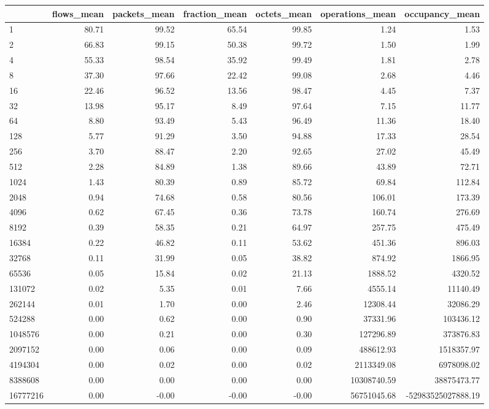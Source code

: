 \begin{tabular}{lrrrrrr}
\toprule
 & flows_mean & packets_mean & fraction_mean & octets_mean & operations_mean & occupancy_mean \\
\midrule
1 & 80.71 & 99.52 & 65.54 & 99.85 & 1.24 & 1.53 \\
2 & 66.83 & 99.15 & 50.38 & 99.72 & 1.50 & 1.99 \\
4 & 55.33 & 98.54 & 35.92 & 99.49 & 1.81 & 2.78 \\
8 & 37.30 & 97.66 & 22.42 & 99.08 & 2.68 & 4.46 \\
16 & 22.46 & 96.52 & 13.56 & 98.47 & 4.45 & 7.37 \\
32 & 13.98 & 95.17 & 8.49 & 97.64 & 7.15 & 11.77 \\
64 & 8.80 & 93.49 & 5.43 & 96.49 & 11.36 & 18.40 \\
128 & 5.77 & 91.29 & 3.50 & 94.88 & 17.33 & 28.54 \\
256 & 3.70 & 88.47 & 2.20 & 92.65 & 27.02 & 45.49 \\
512 & 2.28 & 84.89 & 1.38 & 89.66 & 43.89 & 72.71 \\
1024 & 1.43 & 80.39 & 0.89 & 85.72 & 69.84 & 112.84 \\
2048 & 0.94 & 74.68 & 0.58 & 80.56 & 106.01 & 173.39 \\
4096 & 0.62 & 67.45 & 0.36 & 73.78 & 160.74 & 276.69 \\
8192 & 0.39 & 58.35 & 0.21 & 64.97 & 257.75 & 475.49 \\
16384 & 0.22 & 46.82 & 0.11 & 53.62 & 451.36 & 896.03 \\
32768 & 0.11 & 31.99 & 0.05 & 38.82 & 874.92 & 1866.95 \\
65536 & 0.05 & 15.84 & 0.02 & 21.13 & 1888.52 & 4320.52 \\
131072 & 0.02 & 5.35 & 0.01 & 7.66 & 4555.14 & 11140.49 \\
262144 & 0.01 & 1.70 & 0.00 & 2.46 & 12308.44 & 32086.29 \\
524288 & 0.00 & 0.62 & 0.00 & 0.90 & 37331.96 & 103436.12 \\
1048576 & 0.00 & 0.21 & 0.00 & 0.30 & 127296.89 & 373876.83 \\
2097152 & 0.00 & 0.06 & 0.00 & 0.09 & 488612.93 & 1518357.97 \\
4194304 & 0.00 & 0.02 & 0.00 & 0.02 & 2113349.08 & 6978098.02 \\
8388608 & 0.00 & 0.00 & 0.00 & 0.00 & 10308740.59 & 38875473.77 \\
16777216 & 0.00 & -0.00 & -0.00 & -0.00 & 56751045.68 & -52983525027888.19 \\
\bottomrule
\end{tabular}

